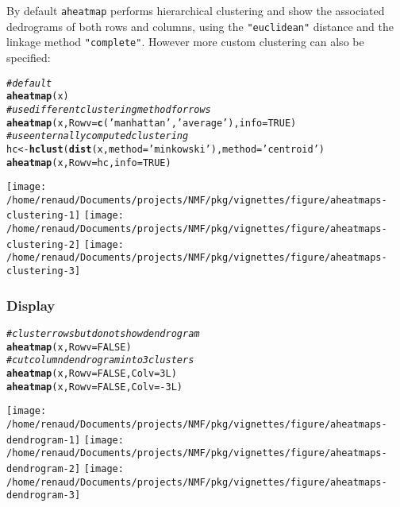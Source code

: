 \documentclass[a4paper]{article}\usepackage[]{graphicx}\usepackage[]{color}
\makeatletter
\newcommand{\hlnum}[1]{\textcolor[rgb]{0.686,0.059,0.569}{#1}}%
\newcommand{\hlstr}[1]{\textcolor[rgb]{0.192,0.494,0.8}{#1}}%
\newcommand{\hlcom}[1]{\textcolor[rgb]{0.678,0.584,0.686}{\textit{#1}}}%
\newcommand{\hlopt}[1]{\textcolor[rgb]{0,0,0}{#1}}%
\newcommand{\hlstd}[1]{\textcolor[rgb]{0.345,0.345,0.345}{#1}}%
\newcommand{\hlkwb}[1]{\textcolor[rgb]{0.69,0.353,0.396}{#1}}%
\newcommand{\hlkwc}[1]{\textcolor[rgb]{0.333,0.667,0.333}{#1}}%
\newcommand{\hlkwd}[1]{\textcolor[rgb]{0.737,0.353,0.396}{\textbf{#1}}}%
\newenvironment{kframe}{%
 \def\at@end@of@kframe{}%
 \ifinner\ifhmode%
  \def\at@end@of@kframe{\end{minipage}}%
  \begin{minipage}{\columnwidth}%
 \fi\fi%
 \def\FrameCommand##1{\hskip\@totalleftmargin \hskip-\fboxsep
 \colorbox{shadecolor}{##1}\hskip-\fboxsep
     \hskip-\linewidth \hskip-\@totalleftmargin \hskip\columnwidth}%
 \MakeFramed {\advance\hsize-\width
   \@totalleftmargin\z@ \linewidth\hsize
   \@setminipage}}%
 {\par\unskip\endMakeFramed%
 \at@end@of@kframe}
\newenvironment{knitrout}{}{} %
\let\code=\texttt
\makeatother
\begin{document}
By default \code{aheatmap} performs hierarchical clustering and show the
associated dedrograms of both rows and columns, using the \code{"euclidean"}
distance and the linkage method \code{"complete"}.
However more custom clustering can also be specified:

\begin{knitrout}\small
{}\color{fgcolor}\begin{kframe}
\begin{alltt}
\hlcom{# default}
\hlkwd{aheatmap}\hlstd{(x)}
\hlcom{# use different clustering method for rows}
\hlkwd{aheatmap}\hlstd{(x,} \hlkwc{Rowv} \hlstd{=} \hlkwd{c}\hlstd{(}\hlstr{'manhattan'}\hlstd{,} \hlstr{'average'}\hlstd{),} \hlkwc{info} \hlstd{=} \hlnum{TRUE}\hlstd{)}
\hlcom{# use enternally computed clustering}
\hlstd{hc} \hlkwb{<-} \hlkwd{hclust}\hlstd{(}\hlkwd{dist}\hlstd{(x,} \hlkwc{method} \hlstd{=} \hlstr{'minkowski'}\hlstd{),} \hlkwc{method} \hlstd{=} \hlstr{'centroid'}\hlstd{)}
\hlkwd{aheatmap}\hlstd{(x,} \hlkwc{Rowv} \hlstd{= hc,} \hlkwc{info} \hlstd{=} \hlnum{TRUE}\hlstd{)}
\end{alltt}
\end{kframe}
\texttt{[image: /home/renaud/Documents/projects/NMF/pkg/vignettes/figure/aheatmaps-clustering-1]} 
\texttt{[image: /home/renaud/Documents/projects/NMF/pkg/vignettes/figure/aheatmaps-clustering-2]} 
\texttt{[image: /home/renaud/Documents/projects/NMF/pkg/vignettes/figure/aheatmaps-clustering-3]} 

\end{knitrout}

\subsubsection{Display}

\begin{knitrout}\small
{}\color{fgcolor}\begin{kframe}
\begin{alltt}
\hlcom{# cluster rows but do not show dendrogram}
\hlkwd{aheatmap}\hlstd{(x,} \hlkwc{Rowv} \hlstd{=} \hlnum{FALSE}\hlstd{)}
\hlcom{# cut column dendrogram into 3 clusters}
\hlkwd{aheatmap}\hlstd{(x,} \hlkwc{Rowv} \hlstd{=} \hlnum{FALSE}\hlstd{,} \hlkwc{Colv} \hlstd{=} \hlnum{3L}\hlstd{)}
\hlkwd{aheatmap}\hlstd{(x,} \hlkwc{Rowv} \hlstd{=} \hlnum{FALSE}\hlstd{,} \hlkwc{Colv} \hlstd{=} \hlopt{-}\hlnum{3L}\hlstd{)}
\end{alltt}
\end{kframe}
\texttt{[image: /home/renaud/Documents/projects/NMF/pkg/vignettes/figure/aheatmaps-dendrogram-1]} 
\texttt{[image: /home/renaud/Documents/projects/NMF/pkg/vignettes/figure/aheatmaps-dendrogram-2]} 
\texttt{[image: /home/renaud/Documents/projects/NMF/pkg/vignettes/figure/aheatmaps-dendrogram-3]} 

\end{knitrout}
\end{document}
